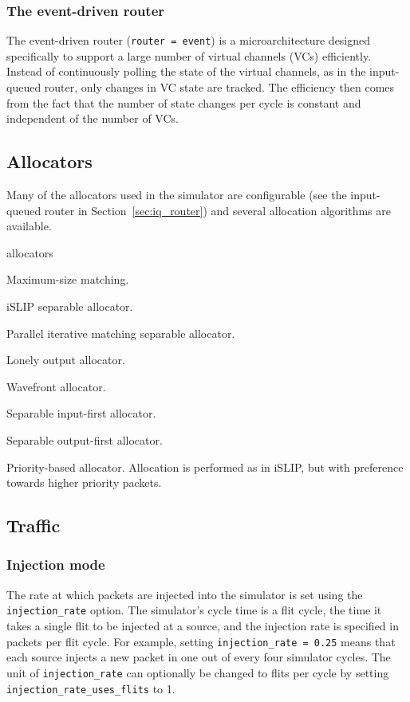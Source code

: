 \documentclass[11pt]{article}
\begin{document}
\subsubsection{The event-driven router}
\label{sec:event_router}

The event-driven router (\texttt{router = event}) is a
microarchitecture designed specifically to support a large number of
virtual channels (VCs) efficiently.  Instead of continuously polling
the state of the virtual channels, as in the input-queued router, only
changes in VC state are tracked.  The efficiency then comes from the
fact that the number of state changes per cycle is constant and
independent of the number of VCs.

\subsection{Allocators}
\label{sec:alloc}

Many of the allocators used in the simulator are configurable (see
the input-queued router in Section~\ref{sec:iq_router}) and several
allocation algorithms are available.

\begin{opt_list}{allocators}

\item[max\_size] Maximum-size matching. 
\item[islip] iSLIP separable allocator.
\item[pim] Parallel iterative matching separable allocator.
\item[loa] Lonely output allocator.
\item[wavefront] Wavefront allocator.
\item[separable\_input\_first] Separable input-first allocator.
\item[separable\_output\_first] Separable output-first allocator.
\item[select] Priority-based allocator.  Allocation is performed as in
iSLIP, but with preference towards higher priority packets.

\end{opt_list}

\subsection{Traffic}
\label{sec:traffic}


\subsubsection{Injection mode}
The rate at which packets are injected into the simulator is set using
the \texttt{injection\_rate} option.  The simulator's cycle time is a
flit cycle, the time it takes a single flit to be injected at a
source, and the injection rate is specified in packets per flit cycle.
For example, setting \texttt{injection\_rate = 0.25} means that each
source injects a new packet in one out of every four simulator cycles.
The unit of \texttt{injection\_rate} can optionally be changed to flits per cycle by 
setting \texttt{injection\_rate\_uses\_flits} to 1.
\end{document}
